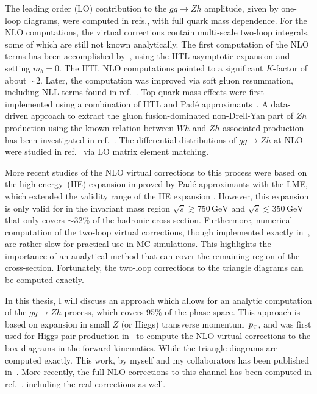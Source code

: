  \par The leading order (LO) contribution to the $g g \rightarrow Z h$ amplitude, given by one-loop diagrams, were computed in refs.\cite{Kniehl:1990iva, Dicus:1988yh}, with full quark mass dependence. For the NLO computations, the virtual corrections contain multi-scale two-loop integrals, some of which are still not known analytically. The first computation of the NLO terms has been accomplished by~\cite{Altenkamp:2012sx}, using the HTL asymptotic expansion and setting $m_b = 0$. The HTL NLO computations pointed to a significant $K$-factor of about $\sim2$.  Later, the computation was improved via soft gluon resummation, including NLL terms found in ref.~\cite{Harlander:2014wda}.  Top quark mass effects were first implemented using a combination of  HTL and Pad\'e approximants~\cite{Hasselhuhn:2016rqt}. A data-driven approach to extract the gluon fusion-dominated non-Drell-Yan part of $Zh$ production using the known relation between  $Wh$
and $ Z h$ associated production has been investigated in ref.~\cite{Harlander:2018yns}. The differential distributions of $g g \rightarrow Zh$  at NLO were studied in ref.~\cite{Hespel:2015zea} via LO matrix element matching.
\par  More recent studies of the NLO virtual corrections to this process were based on the high-energy~(HE) expansion improved by Pad\'e approximants with the LME, which extended the validity range of the HE expansion \cite{Davies:2020drs}. However, this expansion is only valid for in the invariant mass region $\sqrt{\hat{s}}  \gtrsim 750\, \si{\GeV} $ and $\sqrt{\hat{s}}  \lesssim 350\,  \si{\GeV}$ that only covers $\sim 32\%$ of the hadronic cross-section. Furthermore, numerical computation of the two-loop virtual corrections, though implemented exactly in~\cite{Chen:2020gae}, are rather slow for practical use in MC simulations.  This highlights the importance of an analytical method that can cover the remaining region of the cross-section.  Fortunately, the two-loop corrections to the triangle diagrams can be computed exactly. 
\par  In this thesis, I will discuss an approach which allows for an analytic computation of the $gg \to Zh$ process, which covers $95 \%$ of the phase space.  This approach is based on expansion in small  $Z$ (or Higgs) 
 transverse momentum~$p_{\scriptscriptstyle T}$, and was first used for Higgs pair production in~\cite{Bonciani:2018omm} to compute the NLO virtual corrections to the box diagrams in the forward kinematics. While the triangle diagrams are computed exactly. This work, by myself and my collaborators has been published in~\cite{Alasfar:2021ppe}.
More recently, the full NLO corrections to this channel has been computed in ref.~\cite{Degrassi2022a}, including the real corrections as well.
